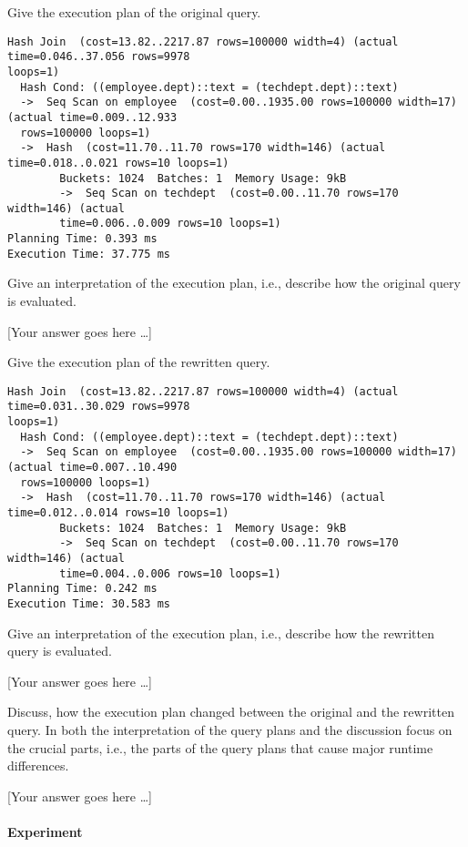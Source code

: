 \documentclass[11pt]{scrartcl}
\newcommand{\youranswerhere}{[Your answer goes here \ldots]}
\begin{document}
    Give the execution plan of the original query.

            {\small
    \parskip0pt
    \begin{verbatim}
Hash Join  (cost=13.82..2217.87 rows=100000 width=4) (actual time=0.046..37.056 rows=9978 
loops=1)
  Hash Cond: ((employee.dept)::text = (techdept.dept)::text)
  ->  Seq Scan on employee  (cost=0.00..1935.00 rows=100000 width=17) (actual time=0.009..12.933 
  rows=100000 loops=1)
  ->  Hash  (cost=11.70..11.70 rows=170 width=146) (actual time=0.018..0.021 rows=10 loops=1)
        Buckets: 1024  Batches: 1  Memory Usage: 9kB
        ->  Seq Scan on techdept  (cost=0.00..11.70 rows=170 width=146) (actual 
        time=0.006..0.009 rows=10 loops=1)
Planning Time: 0.393 ms
Execution Time: 37.775 ms
    \end{verbatim}}

    Give an interpretation of the execution plan, i.e., describe how the original query is evaluated.

    \youranswerhere{}

    Give the execution plan of the rewritten query.

            {\small
    \parskip0pt\begin{verbatim}
Hash Join  (cost=13.82..2217.87 rows=100000 width=4) (actual time=0.031..30.029 rows=9978 
loops=1)
  Hash Cond: ((employee.dept)::text = (techdept.dept)::text)
  ->  Seq Scan on employee  (cost=0.00..1935.00 rows=100000 width=17) (actual time=0.007..10.490 
  rows=100000 loops=1)
  ->  Hash  (cost=11.70..11.70 rows=170 width=146) (actual time=0.012..0.014 rows=10 loops=1)
        Buckets: 1024  Batches: 1  Memory Usage: 9kB
        ->  Seq Scan on techdept  (cost=0.00..11.70 rows=170 width=146) (actual 
        time=0.004..0.006 rows=10 loops=1)
Planning Time: 0.242 ms
Execution Time: 30.583 ms
    \end{verbatim}}

    Give an interpretation of the execution plan, i.e., describe how the rewritten query is evaluated.

    \youranswerhere{}

    Discuss, how the execution plan changed between the original and the rewritten query. In both the interpretation of the query plans and the discussion focus on the crucial parts, i.e., the parts of the query plans that cause major runtime differences.

    \youranswerhere{}

    \paragraph{Experiment}
\end{document}
